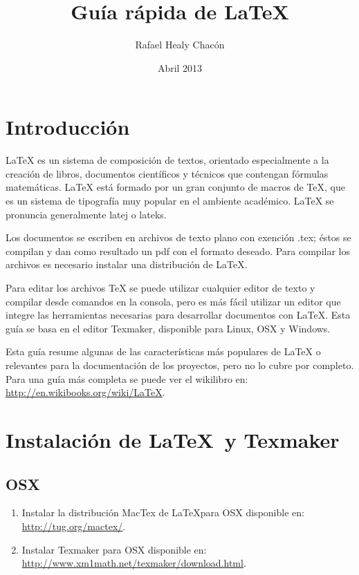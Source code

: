 \documentclass[12pt, a4paper,twoside]{article} %
\title{Guía rápida de \LaTeX}
\author{Rafael Healy Chacón}
\date{Abril 2013}
\begin{document}
\lstset{language=TeX}
\maketitle

\tableofcontents

\clearpage 
\section{Introducción}
LaTeX es un sistema de composición de textos, orientado especialmente a la creación de libros, documentos científicos y técnicos que contengan fórmulas matemáticas. LaTeX está formado por un gran conjunto de macros de TeX, que es un sistema de tipografía muy popular en el ambiente académico. LaTeX se pronuncia generalmente latej o lateks.

Los documentos se escriben en archivos de texto plano con exención .tex; éstos se compilan y dan como resultado un pdf con el formato deseado. Para compilar los archivos es necesario instalar una distribución de LaTeX. 

Para editar los archivos TeX se puede utilizar cualquier editor de texto y compilar desde comandos en la consola, pero es más fácil utilizar un editor que integre las herramientas necesarias para desarrollar documentos con LaTeX. Esta guía se basa en el editor Texmaker, disponible para Linux, OSX y Windows.

Esta guía resume algunas de las características más populares de LaTeX o relevantes para la documentación de los proyectos, pero no lo cubre por completo. Para una guía más completa se puede ver el wikilibro en: \url{http://en.wikibooks.org/wiki/LaTeX}.

\section{Instalación de \LaTeX \ y Texmaker}
\subsection{OSX}
\begin{enumerate}
\item Instalar la distribución MacTex de \LaTeX para OSX disponible en: \url{http://tug.org/mactex/}.
\item Instalar Texmaker para OSX disponible en: \url{http://www.xm1math.net/texmaker/download.html}.
\end{enumerate}
\end{document}

